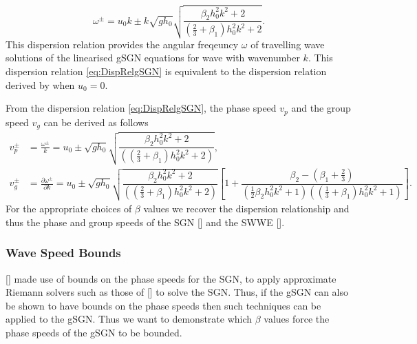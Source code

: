 \documentclass[10pt]{elsarticle}
\begin{document}
\begin{equation}
\omega^\pm = u_0 k \pm k \sqrt{gh_0} \sqrt{\dfrac{\beta_2 h_0^2 k^2 + 2}{\left(\frac{2}{3} + \beta_1\right) h_0^2 k^2 + 2} }.
\label{eq:DispRelgSGN}
\end{equation}
This dispersion relation provides the angular freqeuncy $\omega$ of travelling wave solutions of the linearised gSGN equations for wave with wavenumber $k$. This dispersion relation \eqref{eq:DispRelgSGN} is equivalent to the dispersion relation derived by \cite{Clamond-Dutykh-2018-237} when $u_0 = 0$. 

From the dispersion relation \eqref{eq:DispRelgSGN}, the phase speed $v_p$ and the group speed $v_g$ can be derived as follows
\begin{subequations}
\begin{align}
v^\pm_p &= \frac{\omega^\pm}{k} = u_0 \pm  \sqrt{gh_0} \sqrt{\dfrac{\beta_2 h_0^2 k^2 + 2}{\left( \left(\frac{2}{3} + \beta_1\right) h_0^2 k^2 + 2\right)} },\\
v^\pm_g &= \frac{\partial \omega^\pm }{\partial k}= u_0  \pm  \sqrt{gh_0} \sqrt{\dfrac{\beta_2 h_0^2 k^2 + 2}{\left( \left(\frac{2}{3} + \beta_1\right) h_0^2 k^2 + 2\right)} } \left[1 +  \dfrac{\beta_2 - \left(\beta_1 + \frac{2}{3}\right)}{\left(\frac{1}{2}\beta_2 h_0^2 k^2 +1\right)\left( \left(\frac{1}{3} + \beta_1\right) h_0^2 k^2 + 1\right)}\right].
\end{align}
\label{eq:wavespeeds}
\end{subequations}
For the appropriate choices of $\beta$ values we recover the dispersion relationship and thus the phase and group speeds of the SGN [] and the SWWE [].

\subsubsection{Wave Speed Bounds}
[] made use of bounds on the phase speeds for the SGN, to apply approximate Riemann solvers such as those of [] to solve the SGN. Thus, if the gSGN can also be shown to have bounds on the phase speeds then such techniques can be applied to the gSGN. Thus we want to demonstrate which $\beta$ values force the phase speeds of the gSGN to be bounded. 
\end{document}
